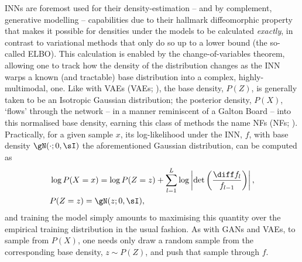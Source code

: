 \acp{INN} are foremost used for their density-estimation -- and by complement, generative modelling
-- capabilities due to their hallmark diffeomorphic property that makes it possible for densities
under the models to be calculated \emph{exactly}, in contrast to variational methods that only do
so up to a lower bound (the so-called \ac{ELBO}). 
%
%
This calculation is enabled by the change-of-variables theorem, allowing one to track how the
density of the distribution changes as the INN warps a known (and tractable) base distribution into
a complex, highly-multimodal, one.
%
Like with \aclp{VAE} (\acsp{VAE}; \citealp{kingma2014auto}), the base density, \(P(Z)\), is generally
taken to be an Isotropic Gaussian distribution; the posterior density, \(P(X)\), `flows' through
the network -- in a manner reminiscent of a Galton Board -- into this normalised base density,
earning this class of methods the name \aclp{NF} (\acsp{NF}; \citealp{rezende2015variational,
kobyzev2020normalizing}).
%
Practically, for a given sample \(x\), its log-likelihood under the \ac{INN}, \(f\), with base
density \(\gN(\cdot; 0, \sI)\) the aforementioned Gaussian distribution, can be computed as
%
\begin{equation*}
%
    \begin{aligned}
        &\log P(X=x) = 
        \log P(Z=z) + \sum_{l=1}^L \log \left| \det\left( \frac{\diff f_l}{ f_{l-1}}\right)
        \right|, \\
        &P(Z=z) = \gN(z; 0, \sI),
    \end{aligned}
\label{eq:cov}
%
\end{equation*}
%
and training the model simply amounts to maximising this quantity over the empirical training
distribution in the usual fashion.
%
As with \acp{GAN} and \acp{VAE}, to sample from \(P(X)\), one needs only draw a random sample from
the corresponding base density, \(z \sim P(Z) \), and push that sample through \(f\).


